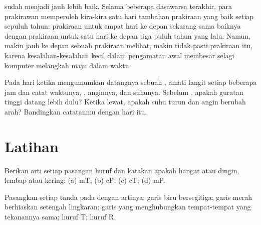  sudah menjadi jauh lebih baik. Selama beberapa dasawarsa
terakhir, para prakirawan memperoleh kira-kira satu hari tambahan
prakiraan yang baik setiap sepuluh tahun: prakiraan untuk empat hari ke
depan sekarang sama baiknya dengan prakiraan untuk satu hari ke depan tiga
puluh tahun yang lalu. Namun, makin jauh ke depan sebuah prakiraan
melihat, makin tidak pasti prakiraan itu, karena kesalahan-kesalahan kecil
dalam pengamatan awal membesar selagi komputer melangkah maju dalam
waktu.

\begin{inthefield}
Pada hari ketika  mengumumkan datangnya sebuah ,
amati langit setiap beberapa jam dan catat waktunya, , anginnya,
dan suhunya. Sebelum , apakah guratan tinggi  
datang lebih dulu? Ketika  lewat, apakah suhu turun dan angin
berubah arah? Bandingkan catatanmu dengan   hari itu.
\end{inthefield}

\section{Latihan}

\begin{exercise}[$\star$]\label{exo:g8:fronts-and-weather-maps:1}
Berikan arti setiap pasangan huruf dan katakan apakah 
hangat atau dingin, lembap atau kering: (a) mT; (b) cP; (c) cT; (d) mP.
\end{exercise}

\begin{exercise}[$\star$]\label{exo:g8:fronts-and-weather-maps:2}
Pasangkan setiap tanda pada   dengan artinya: garis biru
bersegitiga; garis merah berhiaskan setengah lingkaran; garis yang
menghubungkan tempat-tempat yang tekanannya sama; huruf T; huruf R.
\end{exercise}

